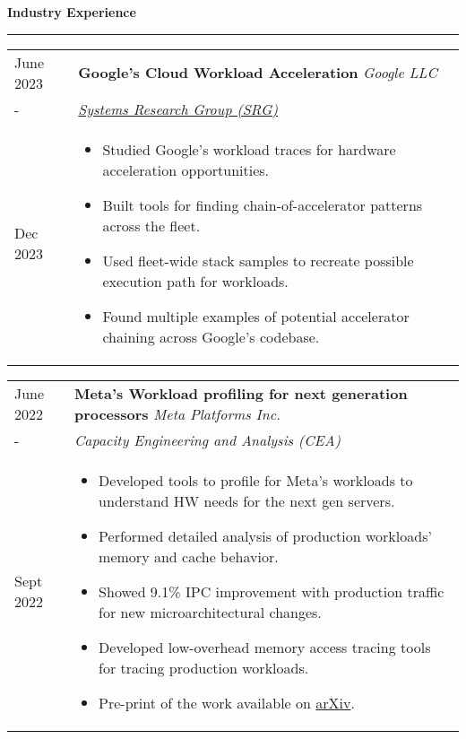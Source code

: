 \documentclass{article}
\newlength{\workexitemsep}
\newlength{\durlen}
\newlength{\deslen}
\newcommand{\sectiontitle}[1]{
  \textbf{\Large{\sffamily #1}}
  \begin{flushright}
      \vspace{-0.48cm} 
      \rule{0.975\textwidth}{1.1pt}
  \end{flushright}
  \vspace{-0.1cm} 
}
\begin{document}
\sectiontitle{Industry Experience}

\begin{tabular}{p{\durlen}p{\deslen}}
  \centering June 2023       & \textbf{Google's Cloud Workload Acceleration} \hfill \textit{Google LLC} \\
  \centering -               & \textit{\href{https://techsysinfra.google/research}{Systems Research Group (SRG)}}\\ 
  \centering Dec 2023        & \vspace{-0.6cm}\begin{itemize}[itemsep=\workexitemsep]
          \item Studied Google's workload traces for hardware acceleration opportunities.
          \item Built tools for finding chain-of-accelerator patterns across the fleet.
          \item Used fleet-wide stack samples to recreate possible execution path for workloads.
          \item Found multiple examples of potential accelerator chaining across Google's codebase.
  \end{itemize}
\end{tabular}

\begin{tabular}{p{\durlen} p{\deslen}}
  \centering June 2022       & \textbf{Meta's Workload profiling for next generation processors} \hfill \textit{Meta Platforms Inc.} \\
  \centering -               & \textit{Capacity Engineering and Analysis (CEA)} \\ 
  \centering Sept 2022       & \vspace{-0.6cm}\begin{itemize}[itemsep=\workexitemsep] 
          \item Developed tools to profile for Meta's workloads to understand HW needs for the next gen servers.
          \item Performed detailed analysis of production workloads' memory and cache behavior.
          \item Showed 9.1\% IPC improvement with production traffic for new microarchitectural changes.
          \item Developed low-overhead memory access tracing tools for tracing production workloads.
          \item Pre-print of the work available on \href{https://arxiv.org/pdf/2303.08396}{arXiv}.
  \end{itemize}
\end{tabular}
\end{document}
